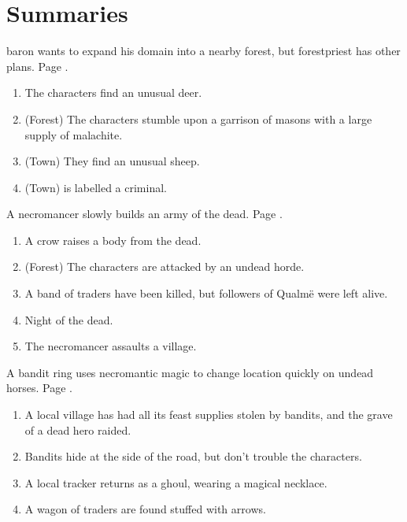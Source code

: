 \setcounter{encnum}{1}


\section{Summaries}


\gls{baron} wants to expand his domain into a nearby forest, but \gls{forestpriest} has other plans.
Page \pageref{herenofarther}.

\begin{enumerate}
	\item{The characters find an unusual deer.}
	\item{(Forest) The characters stumble upon a garrison of masons with a large supply of malachite.}
	\item{(Town) They find an unusual sheep.}
	\item{(Town)  is labelled a criminal.}
\end{enumerate}

A necromancer slowly builds an army of the dead.
Page \pageref{necromancerspet}.

\begin{enumerate}
	\item{A crow raises a body from the dead.}
	\item{(Forest) The characters are attacked by an undead horde.}
	\item{A band of traders have been killed, but followers of Qualm\"{e} were left alive.}
	\item{Night of the dead.}
	\item{ The necromancer assaults a village.}
\end{enumerate}

A bandit ring uses necromantic magic to change location quickly on undead horses.
Page \pageref{immortalbandits}.

\begin{enumerate}

	\item{A local village has had all its feast supplies stolen by bandits, and the grave of a dead hero raided.}
	\item{Bandits hide at the side of the road, but don't trouble the characters.}
	\item{A local tracker returns as a ghoul, wearing a magical necklace.}
	\item{A wagon of traders are found stuffed with arrows.}
\end{enumerate}

